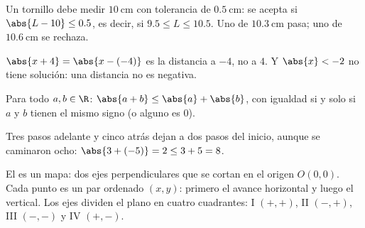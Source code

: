 \documentclass[11pt,a4paper]{article}
\begin{document}
\begin{ejemplo}
Un tornillo debe medir $\SI{10}{\centi\metre}$ con tolerancia de $\SI{0.5}{\centi\metre}$: se acepta si $\abs{L-10}\le 0.5$,
es decir, si $9.5\le L\le 10.5$. Uno de $\SI{10.3}{\centi\metre}$ pasa; uno de $\SI{10.6}{\centi\metre}$ se rechaza.
\end{ejemplo}

\begin{ojo}
$\abs{x+4}=\abs{x-(-4)}$ es la distancia a $-4$, no a $4$. Y $\abs{x}<-2$ no tiene solución: una distancia no es negativa.
\end{ojo}

\begin{propiedad}
Para todo $a,b\in\R$: \quad $\abs{a+b}\le\abs{a}+\abs{b}$, con igualdad si y solo si $a$ y $b$ tienen el mismo signo (o alguno es $0$).
\end{propiedad}
Tres pasos adelante y cinco atrás dejan a dos pasos del inicio, aunque se caminaron ocho: $\abs{3+(-5)}=2\le 3+5=8$.


El  es un mapa: dos ejes perpendiculares que se cortan en el origen $O(0,0)$. Cada punto es
un par ordenado $(x,y)$: primero el avance horizontal y luego el vertical. Los ejes dividen el plano en cuatro
cuadrantes: I $(+,+)$, II $(-,+)$, III $(-,-)$ y IV $(+,-)$.
\end{document}
